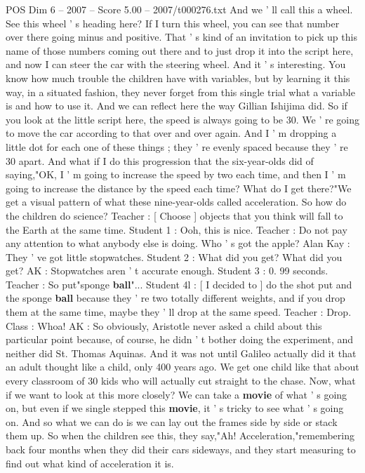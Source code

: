 \begin{textsample}{POS Dim 6 – 2007 – Score 5.00 – 2007/t000276.txt}
And we ' ll call this a wheel.
See this wheel ' s heading here?
If I turn this wheel, you can see that number over there going minus and positive.
That ' s kind of an invitation to pick up this name of those numbers coming out there and to just drop it into the script here, and now I can steer the car with the steering wheel.
And it ' s interesting.
You know how much trouble the children have with variables, but by learning it this way, in a situated fashion, they never forget from this single trial what a variable is and how to use it.
And we can reflect here the way Gillian Ishijima did.
So if you look at the little script here, the speed is always going to be 30.
We ' re going to move the car according to that over and over again.
And I ' m dropping a little dot for each one of these things ; they ' re evenly spaced because they ' re 30 apart.
And what if I do this progression that the six-year-olds did of saying,"OK, I ' m going to increase the speed by two each time, and then I ' m going to increase the distance by the speed each time?
What do I get there?"We get a visual pattern of what these nine-year-olds called acceleration.
So how do the children do science?
Teacher : [ Choose ] objects that you think will fall to the Earth at the same time.
Student 1 : Ooh, this is nice.
Teacher : Do not pay any attention to what anybody else is doing.
Who ' s got the apple?
Alan Kay : They ' ve got little stopwatches.
Student 2 : What did you get?
What did you get?
AK : Stopwatches aren ' t accurate enough.
Student 3 : 0. 99 seconds.
Teacher : So put"sponge \textbf{ball}"...
Student 4l : [ I decided to ] do the shot put and the sponge \textbf{ball} because they ' re two totally different weights, and if you drop them at the same time, maybe they ' ll drop at the same speed.
Teacher : Drop.
Class : Whoa!
AK : So obviously, Aristotle never asked a child about this particular point because, of course, he didn ' t bother doing the experiment, and neither did St.
Thomas Aquinas.
And it was not until Galileo actually did it that an adult thought like a child, only 400 years ago.
We get one child like that about every classroom of 30 kids who will actually cut straight to the chase.
Now, what if we want to look at this more closely?
We can take a \textbf{movie} of what ' s going on, but even if we single stepped this \textbf{movie}, it ' s tricky to see what ' s going on.
And so what we can do is we can lay out the frames side by side or stack them up.
So when the children see this, they say,"Ah!
Acceleration,"remembering back four months when they did their cars sideways, and they start measuring to find out what kind of acceleration it is.

\end{textsample}
